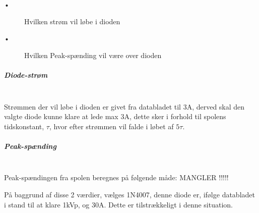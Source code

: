 \begin{description}
 \item[•] Hvilken strøm vil løbe i dioden
 \item[•] Hvilken Peak-spænding vil være over dioden
\end{description}

\subparagraph{Diode-strøm} \hspace{0pt} \\
Strømmen der vil løbe i dioden er givet fra databladet til  3A, derved skal den valgte diode kunne klare at lede max 3A, dette sker i forhold til spolens tidskonstant, $\tau$, hvor efter strømmen vil falde i løbet af $ 5 \tau$.

\subparagraph{Peak-spænding} \hspace{0pt} \\
Peak-spændingen fra spolen beregnes på følgende måde: MANGLER !!!!!

På baggrund af disse 2 værdier, vælges 1N4007, denne diode er, ifølge databladet i stand til at klare 1kVp, og 30A. Dette er tilstrækkeligt i denne situation.